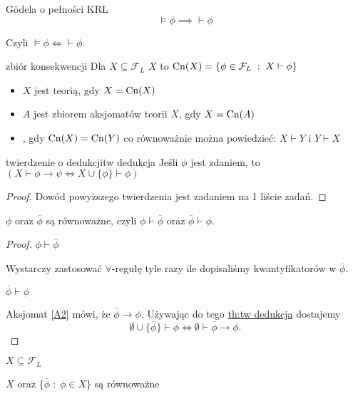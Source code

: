 \begin{theorem}{G\"odela o pełności KRL}{}
  $$\models\phi\implies\vdash\phi$$
\end{theorem}

Czyli $\models\phi\iff\vdash\phi$.

\begin{definition}{zbiór konsekwencji}{}
  Dla $X\subseteq\mathcal{F}_L$  $X$ to $\operatorname{Cn}(X)=\{\phi\in\mathcal{F}_L\;:\;X\vdash \phi\}$
  \begin{itemize}
    \item $X$ jest teorią, gdy $X=\operatorname{Cn}(X)$
    \item $A$ jest zbiorem aksjomatów teorii $X$, gdy $X=\operatorname{Cn}(A)$
    \item {}, gdy $\operatorname{Cn}(X)=\operatorname{Cn}(Y)$ co równoważnie można powiedzieć: $X\vdash Y$ i $Y\vdash X$
  \end{itemize}
\end{definition}

\begin{theorem}{twierdzenie o dedukcji}{tw dedukcja}
  Jeśli $\phi$ jest zdaniem, to $(X\vdash\phi\to\psi\iff X\cup\{\phi\}\vdash\phi)$
\end{theorem}

\begin{proof}
  Dowód powyższego twierdzenia jest zadaniem na 1 liście zadań.
\end{proof}

\begin{fact}{}{}
  $\phi$ oraz $\overline{\phi}$ są równoważne, czyli $\phi\vdash\overline{\phi}$ oraz $\overline{\phi}\vdash\phi$.
\end{fact}
\begin{proof}
  $\phi\vdash\overline{\phi}$ 

  Wystarczy zastosować $\forall$-regułę tyle razy ile dopisaliśmy kwantyfikatorów w $\overline{\phi}$.

  $\overline{\phi}\vdash\phi$ 

  Aksjomat \ref{A2} mówi, że $\overline{\phi}\to\phi$. Używając do tego \hyperref[twierdzenia o dedukcji]{th:tw dedukcja} dostajemy
  $$\emptyset\cup\{\overline{\phi}\}\vdash \phi\iff\emptyset\vdash\overline{\phi}\to\phi.$$
\end{proof}

\begin{conclusion}{}{}
  $X\subseteq\mathcal{F}_L$

  $X$ oraz $\{\overline{\phi}\;:\;\phi\in X\}$ są równoważne
\end{conclusion}

